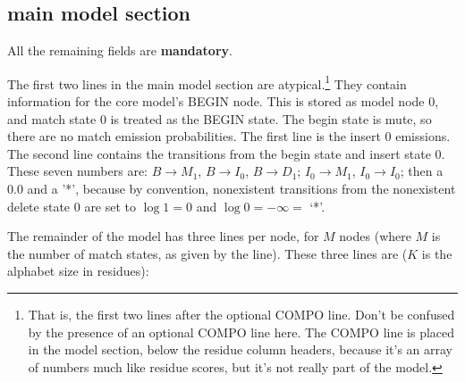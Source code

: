 \subsection{main model section}

All the remaining fields are \textbf{mandatory}.

The first two lines in the main model section are
atypical.\footnote{That is, the first two lines after the optional
  COMPO line. Don't be confused by the presence of an optional COMPO
  line here. The COMPO line is placed in the model section, below the
  residue column headers, because it's an array of numbers much like
  residue scores, but it's not really part of the model.}  They
contain information for the core model's BEGIN node. This is stored as
model node 0, and match state 0 is treated as the BEGIN state.  The
begin state is mute, so there are no match emission probabilities. The
first line is the insert 0 emissions. The second line contains the
transitions from the begin state and insert state 0.  These seven
numbers are: $B \rightarrow M_1$, $B \rightarrow I_0$, $B \rightarrow
D_1$; $I_0 \rightarrow M_1$, $I_0 \rightarrow I_0$; then a 0.0 and a
'*', because by convention, nonexistent transitions from the
nonexistent delete state 0 are set to $\log 1 = 0$ and $\log 0 =
-\infty = $ `*'.

The remainder of the model has three lines per node, for $M$ nodes
(where $M$ is the number of match states, as given by the 
line). These three lines are ($K$ is the alphabet size in residues):

